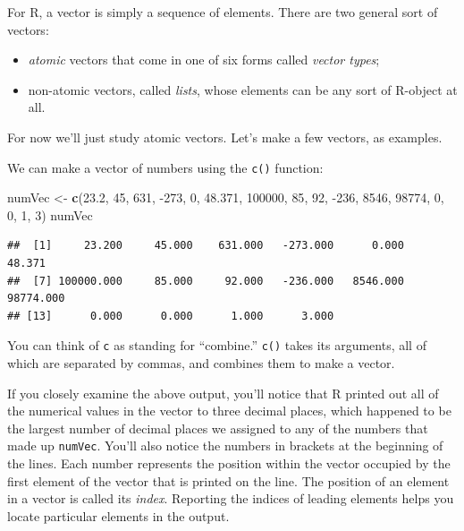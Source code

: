 \documentclass[]{book}
\makeatletter
\newenvironment{Shaded}{\begin{snugshade}}{\end{snugshade}}
\newcommand{\KeywordTok}[1]{\textcolor[rgb]{0.13,0.29,0.53}{\textbf{{#1}}}}
\newcommand{\DecValTok}[1]{\textcolor[rgb]{0.00,0.00,0.81}{{#1}}}
\newcommand{\FloatTok}[1]{\textcolor[rgb]{0.00,0.00,0.81}{{#1}}}
\newcommand{\StringTok}[1]{\textcolor[rgb]{0.31,0.60,0.02}{{#1}}}
\newcommand{\NormalTok}[1]{{#1}}
\providecommand{\tightlist}{%
  \setlength{\itemsep}{0pt}\setlength{\parskip}{0pt}}
\newenvironment{kframe}{%
\medskip{}
\setlength{\fboxsep}{.8em}
 \def\at@end@of@kframe{}%
 \ifinner\ifhmode%
  \def\at@end@of@kframe{\end{minipage}}%
  \begin{minipage}{\columnwidth}%
 \fi\fi%
 \def\FrameCommand##1{\hskip\@totalleftmargin \hskip-\fboxsep
 \colorbox{shadecolor}{##1}\hskip-\fboxsep
     \hskip-\linewidth \hskip-\@totalleftmargin \hskip\columnwidth}%
 \MakeFramed {\advance\hsize-\width
   \@totalleftmargin\z@ \linewidth\hsize
   \@setminipage}}%
 {\par\unskip\endMakeFramed%
 \at@end@of@kframe}
\renewenvironment{Shaded}{\begin{kframe}}{\end{kframe}}
\theoremstyle{definition}
\theoremstyle{definition}
\theoremstyle{remark}
\makeatother
\begin{document}
For R, a vector is simply a sequence of elements. There are two general
sort of vectors:

\begin{itemize}
\tightlist
\item
  \emph{atomic} vectors that come in one of six forms called
  \emph{vector types};
\item
  non-atomic vectors, called \emph{lists}, whose elements can be any
  sort of R-object at all.
\end{itemize}

For now we'll just study atomic vectors. Let's make a few vectors, as
examples.

We can make a vector of numbers using the
\texttt{c()} function:

\begin{Shaded}
\begin{Highlighting}[]
\NormalTok{numVec <-}\StringTok{ }\KeywordTok{c}\NormalTok{(}\FloatTok{23.2}\NormalTok{, }\DecValTok{45}\NormalTok{, }\DecValTok{631}\NormalTok{, -}\DecValTok{273}\NormalTok{, }\DecValTok{0}\NormalTok{, }\FloatTok{48.371}\NormalTok{, }\DecValTok{100000}\NormalTok{,}
            \DecValTok{85}\NormalTok{, }\DecValTok{92}\NormalTok{, -}\DecValTok{236}\NormalTok{, }\DecValTok{8546}\NormalTok{, }\DecValTok{98774}\NormalTok{, }\DecValTok{0}\NormalTok{, }\DecValTok{0}\NormalTok{, }\DecValTok{1}\NormalTok{, }\DecValTok{3}\NormalTok{)}
\NormalTok{numVec}
\end{Highlighting}
\end{Shaded}

\begin{verbatim}
##  [1]     23.200     45.000    631.000   -273.000      0.000     48.371
##  [7] 100000.000     85.000     92.000   -236.000   8546.000  98774.000
## [13]      0.000      0.000      1.000      3.000
\end{verbatim}

You can think of \texttt{c} as standing for ``combine.'' \texttt{c()}
takes its arguments, all of which are separated by commas, and combines
them to make a vector.

If you closely examine the above output, you'll notice that R printed
out all of the numerical values in the vector to three decimal places,
which happened to be the largest number of decimal places we assigned to
any of the numbers that made up \texttt{numVec}. You'll also notice the
numbers in brackets at the beginning of the lines. Each number
represents the position within the vector occupied by the first element
of the vector that is printed on the line. The position of an element in
a vector is called its \emph{index}. Reporting the indices
of leading elements helps you locate particular elements in the output.
\end{document}
